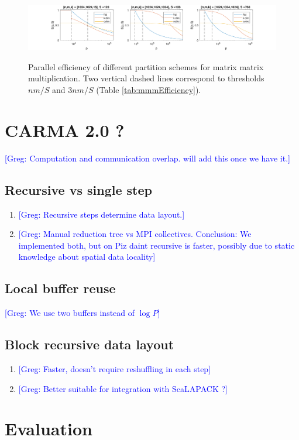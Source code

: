 \documentclass[sigplan,review,anonymous]{acmart}\settopmatter{printfolios=true,printccs=false,printacmref=false}
\newcommand\greg[1]{\textcolor{blue}{[Greg: #1]}}
\begin{document}
 \begin{figure}[t]
 	\hspace*{-1.5cm}
 	\includegraphics[width=2.5\columnwidth]{figures/mmmScaling}
 	\label{fig:mmmScaling}
 	\caption{Parallel efficiency of different partition schemes for matrix 
 		matrix multiplication. Two vertical dashed lines correspond to 
 		thresholds 
 		$nm/S$ and $3nm/S$ (Table \ref{tab:mmmEfficiency}).}
 \end{figure}

\section{CARMA 2.0 ?}
\label{sec:implementation}
 \greg{Computation and communication overlap. will add this once we have it.}
\subsection{Recursive vs single step}
\begin{enumerate}
	\item \greg{Recursive steps determine data layout.}
	\item \greg{Manual reduction tree vs MPI collectives. Conclusion: We 
	implemented both, but on Piz daint recursive is faster, possibly due to 
	static knowledge about spatial data locality}
\end{enumerate}
\subsection{Local buffer reuse}
\greg{We use two buffers instead of $\log P$}
\subsection{Block recursive data layout}
\begin{enumerate}
	\item \greg{Faster, doesn't require reshuffling in each step}
	\item \greg{Better suitable for integration with ScaLAPACK ?}
\end{enumerate}


\section{Evaluation}
\label{sec:evaluation}
\end{document}
